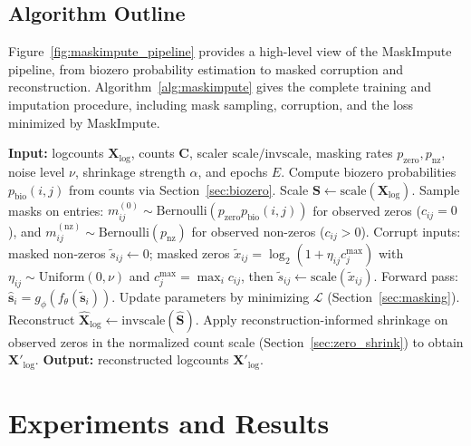 \documentclass{article}
\theoremstyle{plain}
\theoremstyle{definition}
\theoremstyle{remark}
\begin{document}
\subsection{Algorithm Outline}
Figure~\ref{fig:maskimpute_pipeline} provides a high-level view of the MaskImpute
pipeline, from biozero probability estimation to masked corruption and
reconstruction. Algorithm~\ref{alg:maskimpute} gives the complete
training and imputation procedure, including mask sampling, corruption, and the
loss minimized by MaskImpute.

\begin{algorithm}[H]
\caption{MaskImpute training and imputation.}
\label{alg:maskimpute}
\begin{algorithmic}[1]
\raggedright
\STATE \textbf{Input:} logcounts $\mathbf{X}_{\log}$, counts $\mathbf{C}$,
scaler $\mathrm{scale}/\mathrm{invscale}$, masking rates
$p_{\mathrm{zero}},p_{\mathrm{nz}}$, noise level $\nu$, shrinkage strength
$\alpha$, and epochs $E$.
\STATE Compute biozero probabilities $p_{\mathrm{bio}}(i,j)$ from counts via
Section~\ref{sec:biozero}.
\STATE Scale $\mathbf{S}\leftarrow\mathrm{scale}(\mathbf{X}_{\log})$.
\STATE Sample masks on entries: $m^{(0)}_{ij}\sim\mathrm{Bernoulli}(p_{\mathrm{zero}}p_{\mathrm{bio}}(i,j))$
for observed zeros ($c_{ij}=0$), and $m^{(\mathrm{nz})}_{ij}\sim\mathrm{Bernoulli}(p_{\mathrm{nz}})$
for observed non-zeros ($c_{ij}>0$).
\STATE Corrupt inputs: masked non-zeros $\tilde{s}_{ij}\leftarrow 0$; masked
zeros $\tilde{x}_{ij}=\log_2(1+\eta_{ij}c^{\max}_j)$ with
$\eta_{ij}\sim\mathrm{Uniform}(0,\nu)$ and $c^{\max}_j=\max_i c_{ij}$, then
$\tilde{s}_{ij}\leftarrow\mathrm{scale}(\tilde{x}_{ij})$.
\STATE Forward pass: $\hat{\mathbf{s}}_i=g_\phi(f_\theta(\tilde{\mathbf{s}}_i))$.
\STATE Update parameters by minimizing $\mathcal{L}$ (Section~\ref{sec:masking}).
\ENDFOR
\ENDFOR
\STATE Reconstruct $\hat{\mathbf{X}}_{\log}\leftarrow\mathrm{invscale}(\hat{\mathbf{S}})$.
\STATE Apply reconstruction-informed shrinkage on observed zeros in the
normalized count scale (Section~\ref{sec:zero_shrink}) to obtain
$\mathbf{X}'_{\log}$.
\STATE \textbf{Output:} reconstructed logcounts $\mathbf{X}'_{\log}$.
\end{algorithmic}
\end{algorithm}
\FloatBarrier

\section{Experiments and Results}
\label{sec:experiments}
\end{document}
